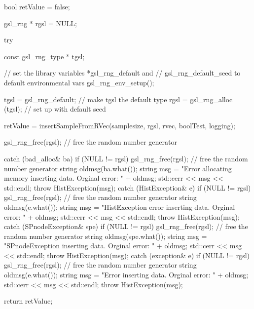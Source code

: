 \begin{DoxyCode}
{
    bool retValue = false;

    gsl_rng * rgsl = NULL;

    try {

        const gsl_rng_type * tgsl;

        // set the library variables *gsl_rng_default and
        // gsl_rng_default_seed to default environmental vars
        gsl_rng_env_setup();

        tgsl = gsl_rng_default; // make tgsl the default type
        rgsl = gsl_rng_alloc (tgsl); // set up with default seed

        retValue = insertSampleFromRVec(samplesize, rgsl, rvec, boolTest,
                logging);

        gsl_rng_free(rgsl); // free the random number generator
    }
    catch (bad_alloc& ba) {
        if (NULL != rgsl) gsl_rng_free(rgsl); // free the random number
       generator
        string oldmsg(ba.what());
        string msg = "Error allocating memory inserting data.  Orginal error: "
                                            + oldmsg;
        std::cerr << msg << std::endl;
        throw HistException(msg);
    }
    catch (HistException& e) {
        if (NULL != rgsl) gsl_rng_free(rgsl); // free the random number
       generator
        string oldmsg(e.what());
        string msg = "HistException error inserting data.  Orginal error: "
                                    + oldmsg;
        std::cerr << msg << std::endl;
        throw HistException(msg);
    }
    catch (SPnodeException& spe) {
        if (NULL != rgsl) gsl_rng_free(rgsl); // free the random number
       generator
        string oldmsg(spe.what());
        string msg = "SPnodeException inserting data.  Orginal error: " + 
      oldmsg;
        std::cerr << msg << std::endl;
        throw HistException(msg);
    }
    catch (exception& e) {
        if (NULL != rgsl) gsl_rng_free(rgsl); // free the random number
       generator
        string oldmsg(e.what());
        string msg = "Error inserting data.  Orginal error: " + oldmsg;
        std::cerr << msg << std::endl;
        throw HistException(msg);
    }

    return retValue;
}
\end{DoxyCode}
